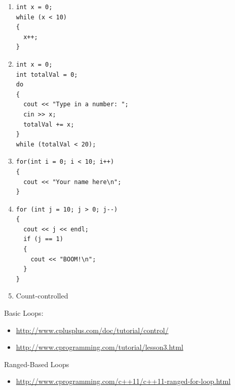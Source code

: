 \begin{enumerate}

\item
\noindent\begin{minipage}{\linewidth}\begin{lstlisting}
int x = 0;
while (x < 10)
{
  x++;
} 
\end{lstlisting}\end{minipage}

\item
\noindent\begin{minipage}{\linewidth}\begin{lstlisting}
int x = 0;
int totalVal = 0;
do
{
  cout << "Type in a number: "; 
  cin >> x;
  totalVal += x;
}
while (totalVal < 20); 
\end{lstlisting}\end{minipage}

\item 
\noindent\begin{minipage}{\linewidth}\begin{lstlisting}
for(int i = 0; i < 10; i++)
{
  cout << "Your name here\n";
}
\end{lstlisting}\end{minipage}

\item
\noindent\begin{minipage}{\linewidth}\begin{lstlisting}
for (int j = 10; j > 0; j--)
{
  cout << j << endl;
  if (j == 1)
  {
    cout << "BOOM!\n";
  }
}
\end{lstlisting}\end{minipage}

\item Count-controlled

\end{enumerate}


Basic Loops:
\begin{itemize}
\item \url{http://www.cplusplus.com/doc/tutorial/control/}
\item \url{http://www.cprogramming.com/tutorial/lesson3.html}
\end{itemize}

\noindent Ranged-Based Loops
\begin{itemize}
\item \url{http://www.cprogramming.com/c++11/c++11-ranged-for-loop.html}
\end{itemize}


